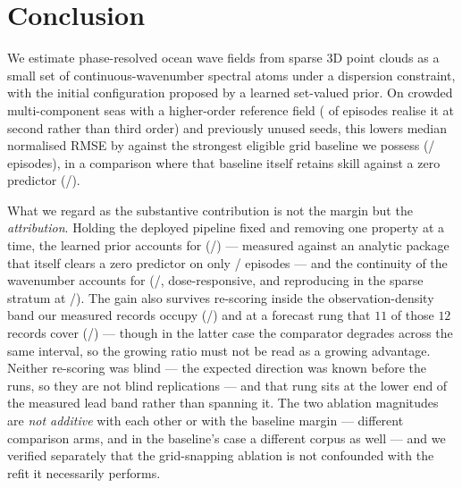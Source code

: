 \documentclass[review]{elsarticle}
\begin{document}
\section{Conclusion}
\label{sec:conclusion}


We estimate phase-resolved ocean wave fields from sparse 3D point clouds as a small
set of continuous-wavenumber spectral atoms under a dispersion constraint, with the
initial configuration proposed by a learned set-valued prior.
On crowded multi-component seas with a higher-order reference field
(\HosCrowdedDegraded{} of \HosCrowdedN{} episodes realise it at second rather than
third order) and previously unused
seeds, this lowers median normalised RMSE by \BTwelveRel{} against the strongest
eligible grid baseline we possess (\BTwelveBetter{}/\BTwelveN{} episodes), in a
comparison where that baseline itself retains skill against a zero predictor
(\BTwelveCmpBetter{}/\BTwelveCmpN{}).

What we regard as the substantive contribution is not the margin but the
\emph{attribution}. Holding the deployed pipeline fixed and removing one property at
a time, the learned prior accounts for \BTwentyTwoRel{}
(\BTwentyTwoBetter{}/\BTwentyTwoN{}) --- measured against an analytic package that
itself clears a zero predictor on only \BTwentyTwoAnaZero{}/\BTwentyTwoN{} episodes
--- and the continuity of the wavenumber accounts for \BSixteenRel{}
(\BSixteenBetter{}/\BSixteenN{}, dose-responsive, and reproducing in the sparse
stratum at \BNineteenBetter{}/\BNineteenN{}). The gain also survives
re-scoring inside the observation-density band our measured records occupy
(\MTenBetter{}/\MTenN{}) and at a forecast rung that $11$ of those $12$ records cover (\TFourBetter{}/\TFourN{}) --- though in the latter case the comparator
degrades across the same interval, so the growing ratio must not be read as a
growing advantage.
Neither re-scoring was blind --- the expected direction was known before the runs,
so they are not blind replications --- and that rung sits at the lower end of the
measured lead band rather than spanning it. The two ablation magnitudes are \emph{not
additive} with each other or with the baseline margin --- different comparison arms,
and in the baseline's case a different corpus as well --- and we verified separately that the grid-snapping
ablation is not confounded with the refit it necessarily performs.
\end{document}
